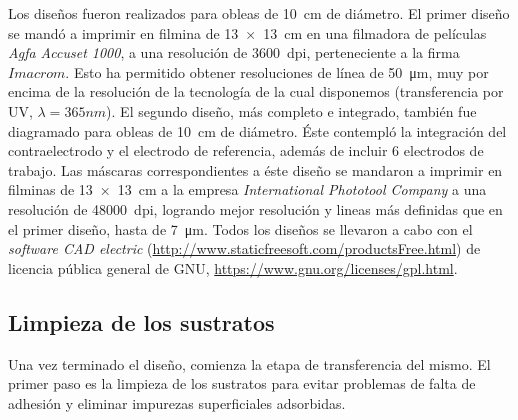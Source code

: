 		Los diseños fueron realizados para obleas de \SI{10}{\cm} de diámetro. El primer diseño se mandó a imprimir en filmina de \SI{13x13}{\cm} en una filmadora de películas \textit{Agfa Accuset 1000}, a una resolución de \SI{3600}{dpi}, perteneciente a la firma $Imacrom$. Esto ha permitido obtener resoluciones de línea de \SI{50}{\um}, muy por encima de la resolución de la tecnología de la cual disponemos (transferencia por UV, $\lambda=365nm$). El segundo diseño, más completo e integrado, también fue diagramado para obleas de \SI{10}{\cm} de diámetro. Éste contempló la integración del contraelectrodo y el electrodo de referencia, además de incluir 6 electrodos de trabajo. Las máscaras correspondientes a éste diseño se mandaron a imprimir en filminas de \SI{13x13}{\cm} a la empresa \textit{International Phototool Company} a una resolución de \SI{48000}{dpi}, logrando mejor resolución y lineas más definidas que en el primer diseño, hasta de \SI{7}{\um}. Todos los diseños se llevaron a cabo con el \textit{software CAD electric} (\url{http://www.staticfreesoft.com/productsFree.html}) de licencia pública general de GNU, \url{https://www.gnu.org/licenses/gpl.html}. 
				
	\subsection{Limpieza de los sustratos}\label{sec:limpieza}
			
			Una vez terminado el diseño, comienza la etapa de transferencia del mismo. El primer paso es la limpieza de los sustratos para evitar problemas de falta de adhesión y eliminar impurezas superficiales adsorbidas. 

